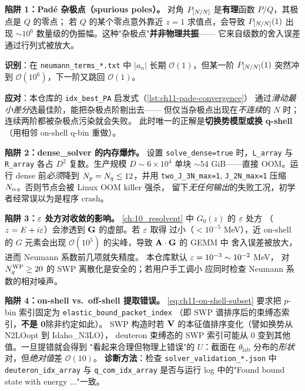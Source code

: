 \begin{pitfallbox}
\textbf{陷阱 1：Padé 杂极点（spurious poles）。}
对角 \(P_{[N/N]}\) 是\textbf{有理}函数 \(P/Q\)，其极点是 \(Q\) 的零点；
若 \(Q\) 的某个零点意外靠近 \(z=1\) 求值点，会导致 \(P_{[N/N]}(1)\) 出现
\(\sim 10^{6}\) 数量级的伪振幅。这种"杂极点"\textbf{并非物理共振}——
它来自级数的舍入误差通过行列式被放大。

\textbf{识别}：在 \texttt{neumann\_terms\_*.txt} 中
\(|a_n|\) 长期 \(\mathcal{O}(1)\)，但某一阶 \(P_{[N/N]}(1)\) 突然冲到
\(\mathcal{O}(10^{6})\)，下一阶又跳回 \(\mathcal{O}(1)\)。

\textbf{应对}：本仓库的 \texttt{idx\_best\_PA} 启发式（\cref{lst:ch11-pade-convergence}）
通过\emph{滑动最小差分}选最佳阶，能把杂极点阶剔出去——
但仅当杂极点出现在\emph{不连续}的 \(N\) 时；连续两阶都被杂极点污染就会失败。
此时唯一的正解是\textbf{切换势模型或换 q-shell}（用相邻
on-shell q-bin 重做）。

\medskip
\textbf{陷阱 2：dense\_solver 的内存爆炸。}
设置 \texttt{solve\_dense=true} 时，\texttt{L\_array} 与
\texttt{R\_array} 各占 \(D^2\) 复数。生产规模 \(D \sim 6 \times 10^4\)
单块 \(\sim\!54\) GiB——直接 OOM。运行 dense 前\emph{必须}降到
\(N_p=N_q \le 12\)，并用 \texttt{two\_J\_3N\_max=1}, \texttt{J\_2N\_max=1}
压缩 \(N_\alpha\)。否则节点会被 Linux OOM killer 强杀，
留下\emph{无任何输出}的失败工况，初学者经常误以为是程序 crash。

\medskip
\textbf{陷阱 3：\(\varepsilon\) 处方对收敛的影响。}
\cref{ch:10_resolvent} 中 \(G_0(z)\) 的 \(\varepsilon\) 处方
（\(z = E + i\varepsilon\)）会渗透到 \(\mathbf{G}\) 的虚部。若 \(\varepsilon\) 取得
过小（\(< 10^{-5}\) MeV），近 on-shell 的 \(G\) 元素会出现
\(\mathcal{O}(10^{5})\) 的尖峰，导致 \(\mathbf{A} \cdot \mathbf{G}\) 的 GEMM 中
舍入误差被放大，进而 Neumann 系数前几项就失精度。
本仓库默认 \(\varepsilon = 10^{-3}\sim 10^{-2}\) MeV，
对 \({N_{q}^{\text{WP}}} \ge 20\) 的 SWP 离散化是安全的；若用户手工调小
应同时检查 Neumann 系数的相对噪声。

\medskip
\textbf{陷阱 4：on-shell vs.\ off-shell 提取错误。}
\cref{eq:ch11-on-shell-subset} 要求把 \(p\)-bin 索引固定为 \texttt{elastic\_bound\_packet\_index}
（即 SWP 谱排序后的束缚态索引，\textbf{不是 0}除非约定如此）。
SWP 构造时若 \(\mathbf{V}\) 的本征值排序变化（譬如换势从 N2LOopt 到 Idaho\_N3LO），
deuteron 束缚态的 SWP 索引可能从 0 变到其他值。一旦提错就会得到
"看起来合理但物理上错误"的 \(U\)：截面在 \(\theta_{\text{lab}}\)
分布的\emph{形状}对，但\emph{绝对值}差 \(\mathcal{O}(10)\)。
\textbf{诊断方法}：检查 \texttt{solver\_validation\_*.json} 中
\texttt{deuteron\_idx\_array} 与 \texttt{q\_com\_idx\_array}
是否与运行 log 中的"Found bound state with energy ..."一致。


\end{pitfallbox}
